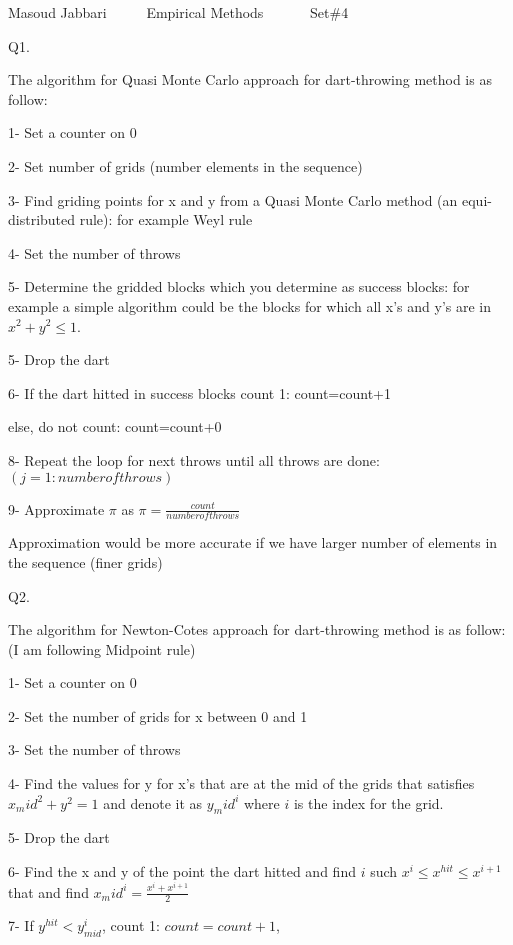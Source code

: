 \documentclass{report}
\begin{document}
\begin{Large}
\begin{center}
\Large{Masoud Jabbari \ \ \ \ \  Empirical Methods \ \ \ \ \ \ Set\#4}
\end{center}
\end{Large}

Q1.

The algorithm for Quasi Monte Carlo approach for dart-throwing method is as follow: 

1- Set a counter on 0

2- Set number of grids (number elements in the sequence)

3- Find griding points for x and y from a Quasi Monte Carlo method (an equi-distributed rule): for example Weyl rule 

4- Set the number of throws

5- Determine the gridded blocks which you determine as success blocks: for example a simple algorithm could be the blocks for which all x's and y's are in $x^2+y^2\leq 1$.  

5- Drop the dart

6- If the dart hitted in success blocks count 1: count=count+1

else, do not count: count=count+0
 

8- Repeat the loop for next throws until all throws are done: $(j=1:number of throws) $  

9- Approximate $\pi$ as $\pi=\frac{count}{number of throws}$

Approximation would be more accurate if we have larger number of elements in the sequence (finer grids)

Q2.

The algorithm for Newton-Cotes approach for dart-throwing method is as follow: (I am following Midpoint rule)

1- Set a counter on 0

2- Set the number of grids for x between 0 and 1

3- Set the number of throws

4- Find the values for y for x's that are at the mid of the grids that satisfies $x_mid^2+y^2=1$ and denote it as $y_mid^i$ where $i$ is the index for the grid.

5- Drop the dart

6- Find the x and y of the point the dart hitted and find $i$ such $x^{i}\leq x^{hit}\leq x^{i+1}$ that and find
 $x_mid^{i}=\frac{x^{i}+x^{i+1}}{2}$
 
7- If $y^{hit}<y_{mid}^{i}$, count 1: $count=count+1$,
\end{document}
